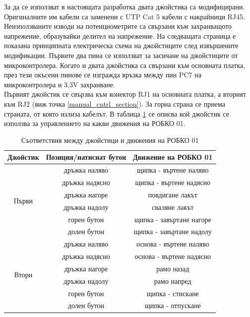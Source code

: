 За да се използват в настоящата разработка двата джойстика са модифицирани. Оригиналните им кабели са заменени с UTP Cat 5 кабели с накрайници RJ45. Неизползваните изводи на потенциометрите са свързани към захранващото напрежение, образувайки делител на напрежение. На следващата страница е показана принципната електрическа схема на джойстиците след извършените модификации. Първите два пина се използват за засичане на джойстиците от микроконтролера. Когато и двата джойстика са свързани към основната платка, през тези окъсени пинове се изгражда връзка между пин PC7 на микроконтролера и 3,3V захранване.\\
\indent{}
Първият джойстик се свързва към конектор RJ1 на основната платка, а вторият към RJ2 (виж точка \ref{manual_cntrl_section}). За горна страна се приема страната, от която излиза кабелът. В таблица \ref{tab:joysticks} се описва кой джойстик се използва за управлението на какви движения на РОБКО 01.
\begin{table}[!th]
    \centering
    \begin{tabular}{|c|c|c|}
        \hline
        Джойстик & Позиция/натиснат бутон & Движение на РОБКО 01\\
        \hline
        \multirow{6}{*}{Първи} & дръжка наляво & щипка - въртене наляво\\
        & дръжка надясно & щипка - въртене надясно\\
        \cline{2-3}
        & дръжка нагоре & повдигане лакът\\
        & дръжка надолу & сваляне лакът\\
        \cline{2-3}
        & горен бутон & щипка - завъртане нагоре\\
        & долен бутон & щипка - завъртане надолу\\
        \hline
        \multirow{6}{*}{Втори} & дръжка наляво & основа - въртене наляво\\
        & дръжка надясно & основа - въртене надясно\\
        \cline{2-3}
        & дръжка нагоре & рамо назад\\
        & дръжка надолу & рамо напред\\
        \cline{2-3}
        & горен бутон & щипка - стискане\\
        & долен бутон & щипка - отпускане\\
        \hline
    \end{tabular}
    \caption{Съответствия между джойстици и движения на РОБКО 01}
    \label{tab:joysticks}
\end{table}
\FloatBarrier

